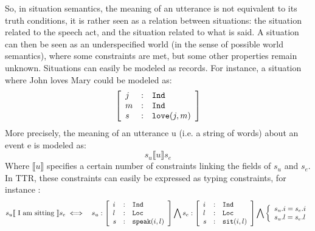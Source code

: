 \documentclass[11pt]{article}
\newenvironment{recenv}
{\left[\begin{array}{lll}}
{\end{array}\right]}
\begin{document}
			So, in situation semantics, the meaning of an utterance is not equivalent to its truth conditions, it is rather seen as a relation between situations: the situation related to the speech act, and the situation related to what is said. A situation can then be seen as an underspecified world (in the sense of possible world semantics), where some constraints are met, but some other properties remain unknown. Situations can easily be modeled as records. For instance, a situation where John loves Mary could be modeled as:
			\begin{equation*}
				\begin{recenv}
					j &:& \texttt{Ind} \\
					m &:& \texttt{Ind} \\
					s &:& \texttt{love}(j, m)
				\end{recenv}
			\end{equation*}
			More precisely, the meaning of an utterance u (i.e. a string of words) about an event e is modeled as:
			\begin{equation*}
			 s_u \llbracket u \rrbracket s_e
			\end{equation*}
			Where $\llbracket u \rrbracket$ specifies a certain number of constraints linking the fields of $s_u$ and $s_e$. In TTR, these constraints can easily be expressed as typing constraints, for instance \cite{barwise1998}:
			\begin{eqnarray*}
				s_u \llbracket\mbox{ I am sitting } \rrbracket s_e
				&\iff&
				s_u : \begin{recenv}
					i &:& \texttt{Ind} \\
					l &:& \texttt{Loc}\\
					s &:& \texttt{speak}(i, l)
				\end{recenv} \bigwedge
				s_e : \begin{recenv}
					i &:& \texttt{Ind} \\
					l &:& \texttt{Loc}\\
					s &:& \texttt{sit}(i, l)
				\end{recenv}
				\bigwedge					
				\left\lbrace\begin{array}{l}
				s_u.i = s_e.i\\
				s_u.l = s_e.l
				\end{array}\right.
			\end{eqnarray*}
			
			
\end{document}
